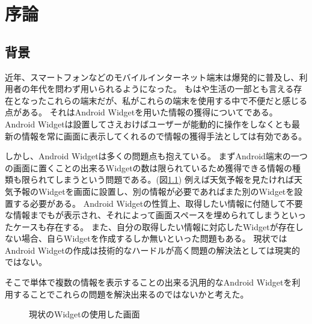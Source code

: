 \chapter{序論}
\label{chap:introduction}
\section{背景}


近年、スマートフォンなどのモバイルインターネット端末は爆発的に普及し、利用者の年代を問わず用いられるようになった。
もはや生活の一部とも言える存在となったこれらの端末だが、私がこれらの端末を使用する中で不便だと感じる点がある。
それはAndroid Widgetを用いた情報の獲得についてである。
Android Widgetは設置してさえおけばユーザーが能動的に操作をしなくとも最新の情報を常に画面に表示してくれるので情報の獲得手法としては有効である。

しかし、Android Widgetは多くの問題点も抱えている。
まずAndroid端末の一つの画面に置くことの出来るWidgetの数は限られているため獲得できる情報の種類も限られてしまうという問題である。(図\ref{fig:old_widget})
例えば天気予報を見たければ天気予報のWidgetを画面に設置し、別の情報が必要であればまた別のWidgetを設置する必要がある。
Android Widgetの性質上、取得したい情報に付随して不要な情報までもが表示され、それによって画面スペースを埋められてしまうといったケースも存在する。
また、自分の取得したい情報に対応したWidgetが存在しない場合、自らWidgetを作成するしか無いといった問題もある。
現状ではAndroid Widgetの作成は技術的なハードルが高く問題の解決法としては現実的ではない。

そこで単体で複数の情報を表示することの出来る汎用的なAndroid Widgetを利用することでこれらの問題を解決出来るのではないかと考えた。

\begin{figure}[htbp]
  \begin{minipage}{\hsize}
    \begin{center}
    \end{center}
    \caption{現状のWidgetの使用した画面}
    \label{fig:old_widget}
  \end{minipage}
\end{figure}

